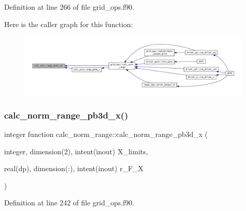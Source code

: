 Definition at line 266 of file grid\+\_\+ops.\+f90.

Here is the caller graph for this function\+:
\nopagebreak
\begin{figure}[H]
\begin{center}
\leavevmode
\includegraphics[width=350pt]{grid__ops_8f90_a9121423739548f1a1fa4e87055f49010_icgraph}
\end{center}
\end{figure}
\mbox{\label{grid__ops_8f90_a242e1c26e16f9cd4b7604de7a90a7472}} 
\subsubsection{\texorpdfstring{calc\+\_\+norm\+\_\+range\+\_\+pb3d\+\_\+x()}{calc\_norm\_range\_pb3d\_x()}}
{\footnotesize\ttfamily integer function calc\+\_\+norm\+\_\+range\+::calc\+\_\+norm\+\_\+range\+\_\+pb3d\+\_\+x (\begin{DoxyParamCaption}\item[{integer, dimension(2), intent(inout)}]{X\+\_\+limits,  }\item[{real(dp), dimension(\+:), intent(inout)}]{r\+\_\+\+F\+\_\+X }\end{DoxyParamCaption})}



Definition at line 242 of file grid\+\_\+ops.\+f90.

